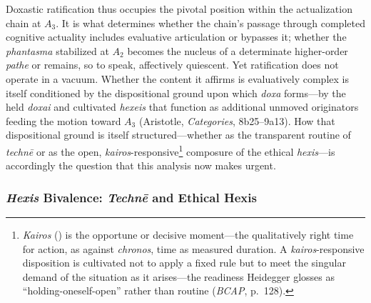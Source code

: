 Doxastic ratification thus occupies the pivotal position within the actualization chain at $A_3$. It is what determines whether the chain's passage through completed cognitive actuality includes evaluative articulation or bypasses it; whether the \textit{phantasma} stabilized at $A_2$ becomes the nucleus of a determinate higher-order \textit{pathe} or remains, so to speak, affectively quiescent. Yet ratification does not operate in a vacuum. Whether the content it affirms is evaluatively complex is itself conditioned by the dispositional ground upon which \textit{doxa} forms---by the held \textit{doxai} and cultivated \textit{hexeis} that function as additional unmoved originators feeding the motion toward $A_3$ (Aristotle, \textit{Categories}, 8b25--9a13). How that dispositional ground is itself structured---whether as the transparent routine of \textit{technē} or as the open, \textit{kairos}-responsive\footnote{\textit{Kairos} () is the opportune or decisive moment---the qualitatively right time for action, as against \textit{chronos}, time as measured duration. A \textit{kairos}-responsive disposition is cultivated not to apply a fixed rule but to meet the singular demand of the situation as it arises---the readiness Heidegger glosses as ``holding-oneself-open'' rather than routine (\textit{BCAP}, p.~128).} composure of the ethical \textit{hexis}---is accordingly the question that this analysis now makes urgent.


\subsubsection*{\textit{Hexis} Bivalence: \textit{Technē} and Ethical Hexis}

